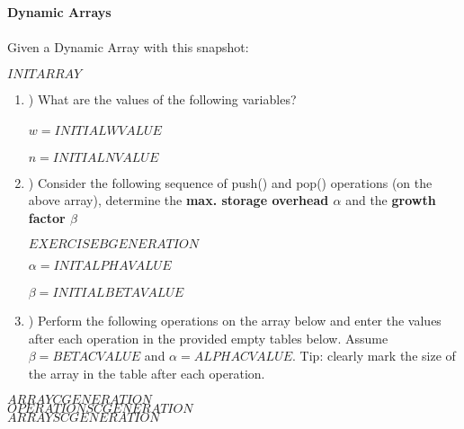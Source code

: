     \textbf{\LARGE{\color{tumgadRed} Dynamic Arrays}}\\
    \\
    \noindent
    Given a Dynamic Array with this snapshot:
    \begin{center}
        $INITARRAY$
    \end{center}
    \begin{enumerate}[label=\alph*]
        \item \hspace{-5px}) What are the values of the following variables?\\
        \\
        \color{tumgadRed}
        $w = INITIALWVALUE$\\
        \\
        $n = INITIALNVALUE$
        \\
        \color{black}
        \item \hspace{-5px}) Consider the following sequence of push() and pop() operations (on the above array), determine the \textbf{max. storage overhead $\alpha$}
        and the \textbf{growth factor $\beta$}
        \begin{center}
            $EXERCISEBGENERATION$
        \end{center}
        \color{tumgadRed}
        $\alpha = INITALPHAVALUE$\\
        \\
        $\beta = INITIALBETAVALUE$\\
        \color{black}
        \item \hspace{-5px}) Perform the following operations on the array below and enter the values after each operation in the provided empty
        tables below. Assume $\beta = BETACVALUE$ and $\alpha = ALPHACVALUE$. Tip: clearly mark the size of the array in the table after each operation.
    \end{enumerate}
    \begin{center}
        $ARRAYCGENERATION$\\
        \color{tumgadRed}
        $OPERATIONSCGENERATION$\\
        $ARRAYSCGENERATION$
        \color{black}
    \end{center}
